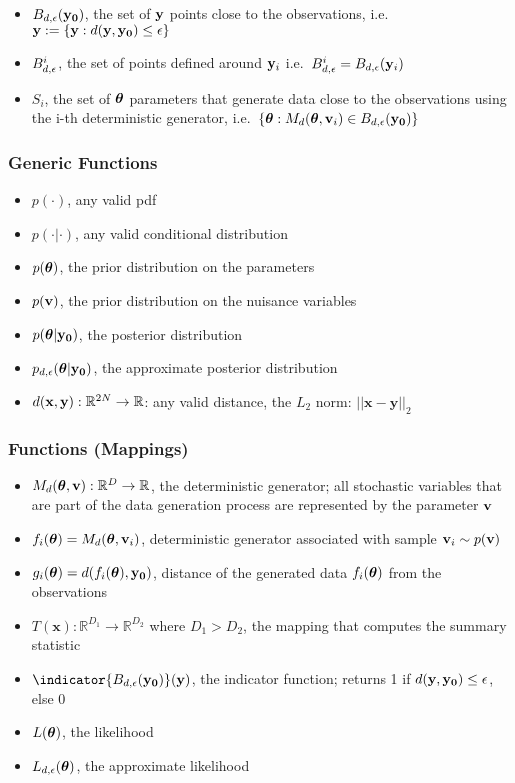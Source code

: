 \begin{itemize}
\item $B_{d,\epsilon}(\mathbf{y_0})$, the set of $\mathbf{y}$ points close to the observations, i.e.\ $\mathbf{y} := \{\mathbf{y}: d(\mathbf{y}, \mathbf{y_0}) \leq \epsilon \}$
\item $B_{d,\epsilon}^i$, the set of points defined around $\mathbf{y}_i$ i.e.\ $B_{d,\epsilon}^i = B_{d,\epsilon}(\mathbf{y}_i)$
\item $S_i$, the set of $\boldsymbol{\theta}$ parameters that generate data close to the observations using the i-th deterministic generator, i.e.\ $\{ \boldsymbol{\theta}: M_d(\boldsymbol{\theta}, \mathbf{v}_i) \in B_{d,\epsilon}(\mathbf{y_0}) \}$
\end{itemize}
    
\subsubsection*{Generic Functions}
\label{sec:generic-functions}

\begin{itemize}
\item $p(\cdot)$, any valid pdf
\item $p(\cdot | \cdot)$, any valid conditional distribution
\item $p(\boldsymbol{\theta})$, the prior distribution on the parameters
\item $p(\mathbf{v})$, the prior distribution on the nuisance variables
\item $p(\boldsymbol{\theta}|\mathbf{y_0})$, the posterior distribution
\item $p_{d,\epsilon}(\boldsymbol{\theta}|\mathbf{y_0})$, the approximate posterior
  distribution  
\item $d(\mathbf{x}, \mathbf{y}): \mathbb{R}^{2N} \rightarrow \mathbb{R}$: any valid
  distance, the $L_2$ norm: $||\mathbf{x}-\mathbf{y}||_2$
\end{itemize}

\subsubsection*{Functions (Mappings)}
\label{sec:functions-mappings}

\begin{itemize}
\item $M_d(\boldsymbol{\theta}, \mathbf{v}): \mathbb{R}^D \rightarrow \mathbb{R}$, the deterministic
  generator; all stochastic variables that are part of the data generation process are represented by the parameter $\mathbf{v}$
\item $f_i(\boldsymbol{\theta}) = M_d(\boldsymbol{\theta}, \mathbf{v}_i)$, deterministic generator associated with sample $\mathbf{v}_i \sim p(\mathbf{v})$
\item $g_i(\boldsymbol{\theta}) = d(f_i(\boldsymbol{\theta}), \mathbf{y_0})$, distance of the generated data $f_i(\boldsymbol{\theta})$ from the observations
\item $T(\mathbf{x}): \mathbb{R}^{D_1} \rightarrow \mathbb{R}^{D_2}$
  where $D_1 > D_2$, the mapping that computes the summary statistic
\item $\indicator{\region(\data)}(\yb)$, the indicator function; returns 1 if $d(\mathbf{y}, \mathbf{y_0}) \leq \epsilon$, else 0
\item $L(\boldsymbol{\theta})$, the likelihood
\item $L_{d,\epsilon}(\boldsymbol{\theta})$, the approximate likelihood
\end{itemize}
